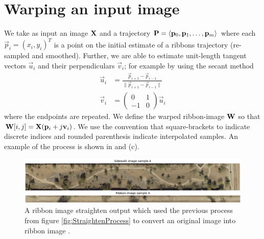\section{Warping an input image}

We take as input an image $\mathbf{X}{}$ and a trajectory $\mathbf{P}{}=\langle \mathbf{p}_0, \mathbf{p}_1,\dots,\mathbf{p}_m\rangle$ where each $\vec{p}_i=(x_i, y_i)^T$ is a point on the initial estimate of a ribbons trajectory (re-sampled and smoothed). Further, we are able to estimate unit-length tangent vectors $\vec{u}_i$ and their perpendiculars $\vec{v}_i$; for example by using the secant method 
\begin{align}
  \vec{u}_i &= \frac{\vec{p}_{i+1}-\vec{p}_{i-1}}{\|\vec{p}_{i+1}-\vec{p}_{i-1}\|} \\
  \vec{v}_i &= \left(\begin{array}{cc}
       0  & 1 \\
       -1 & 0
  \end{array} \right) \vec{u}_i
\end{align}
where the endpoints are repeated. We define the warped ribbon-image $\mathbf{W}{}$ so that $\mathbf{W}{[i,j]}=\mathbf{X}{}(\mathbf{p}_i+ j \mathbf{v}_i)$. We use the convention that square-brackets to indicate discrete indices and rounded parenthesis indicate interpolated samples.  An example of the process is shown in  and (c). 

\begin{figure}
    \centering
    \includegraphics[width=\textwidth]{Figures/Sample4_needed.png}
    \caption[Sample Sidewalk 1]{A ribbon image straighten output which used the previous process from figure \ref{fig:StraightenProcess} to convert an original image into ribbon image .}
    \label{fig:Sample_Sidewalk_4}
\end{figure}


